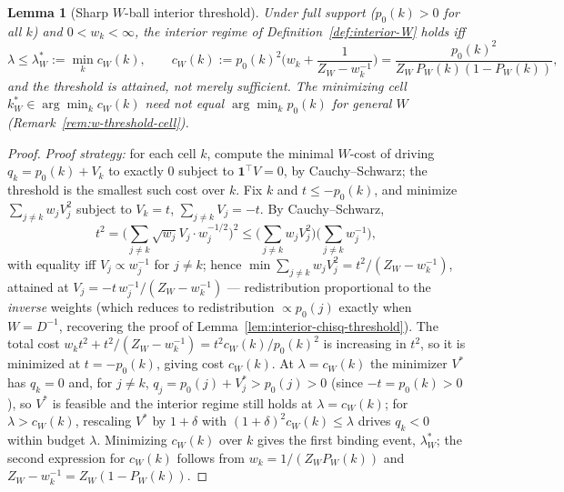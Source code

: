 \documentclass[11pt]{article}
\theoremstyle{plain}
\newtheorem{lemma}[theorem]{Lemma}
\theoremstyle{definition}
\theoremstyle{remark}
\begin{document}
\begin{lemma}[Sharp $W$-ball interior threshold]\label{lem:interior-W-threshold}
Under full support ($p_0(k)>0$ for all $k$) and $0<w_k<\infty$, the interior regime of
Definition~\ref{def:interior-W} holds iff
\begin{equation}\label{eq:threshold-W}
    \lambda\le\lambda^*_W:=\min_kc_W(k),\qquad
    c_W(k):=p_0(k)^2\Big(w_k+\frac1{Z_W-w_k^{-1}}\Big)
    =\frac{p_0(k)^2}{Z_W\,P_W(k)(1-P_W(k))},
\end{equation}
and the threshold is attained, not merely sufficient. The minimizing cell
$k^*_W\in\arg\min_kc_W(k)$ need not equal $\arg\min_kp_0(k)$ for general $W$
(Remark~\ref{rem:w-threshold-cell}).
\end{lemma}

\begin{proof}
\emph{Proof strategy:} for each cell $k$, compute the minimal $W$-cost of driving
$q_k=p_0(k)+V_k$ to exactly $0$ subject to $\mathbf1^\top V=0$, by Cauchy--Schwarz; the
threshold is the smallest such cost over $k$. Fix $k$ and $t\le-p_0(k)$, and minimize
$\sum_{j\ne k}w_jV_j^2$ subject to $V_k=t$, $\sum_{j\ne k}V_j=-t$. By Cauchy--Schwarz,
\[
    t^2=\Big(\sum_{j\ne k}\sqrt{w_j}V_j\cdot w_j^{-1/2}\Big)^2
    \le\Big(\sum_{j\ne k}w_jV_j^2\Big)\Big(\sum_{j\ne k}w_j^{-1}\Big),
\]
with equality iff $V_j\propto w_j^{-1}$ for $j\ne k$; hence
$\min\sum_{j\ne k}w_jV_j^2=t^2/(Z_W-w_k^{-1})$, attained at
$V_j=-t\,w_j^{-1}/(Z_W-w_k^{-1})$ --- redistribution proportional to the \emph{inverse}
weights (which reduces to redistribution $\propto p_0(j)$ exactly when $W=D^{-1}$,
recovering the proof of Lemma~\ref{lem:interior-chisq-threshold}). The total cost
$w_kt^2+t^2/(Z_W-w_k^{-1})=t^2c_W(k)/p_0(k)^2$ is increasing in $t^2$, so it is
minimized at $t=-p_0(k)$, giving cost $c_W(k)$. At $\lambda=c_W(k)$ the minimizer $V^*$
has $q_k=0$ and, for $j\ne k$, $q_j=p_0(j)+V^*_j>p_0(j)>0$ (since $-t=p_0(k)>0$), so
$V^*$ is feasible and the interior regime still holds at $\lambda=c_W(k)$; for
$\lambda>c_W(k)$, rescaling $V^*$ by $1+\delta$ with $(1+\delta)^2c_W(k)\le\lambda$
drives $q_k<0$ within budget $\lambda$. Minimizing $c_W(k)$ over $k$ gives the first
binding event, $\lambda^*_W$; the second expression for $c_W(k)$ follows from
$w_k=1/(Z_WP_W(k))$ and $Z_W-w_k^{-1}=Z_W(1-P_W(k))$.
\end{proof}
\end{document}
